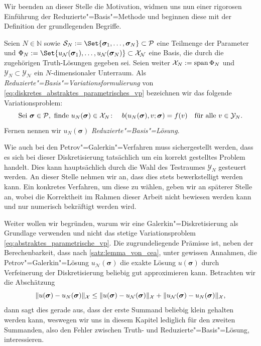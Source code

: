 \documentclass[../main.tex]{subfiles}
\begin{document}
Wir beenden an dieser Stelle die Motivation, widmen uns nun einer rigorosen Einführung der Reduzierte"=Basis"=Methode und beginnen diese mit der Definition der grundlegenden Begriffe.

\begin{Definition}
\label{definition:rb_variationsproblem}
    Seien $N \in \mathbb{N}$ sowie $\mathcal S_{N} := \Set{ \bm \sigma_{1}, \dots, \bm \sigma_{N} } \subset \mathcal P$ eine Teilmenge der Parameter und $\Phi_{N} := \Set{ u_{\mathcal N}(\bm \sigma_{1}), \dots, u_{\mathcal N}(\bm \sigma_{N})} \subset \mathcal X_{\mathcal N}$ eine Basis, die durch die zugehörigen Truth-Lösungen gegeben sei.
    Seien weiter $\mathcal X_{N} := \operatorname{span} \Phi_{N}$ und $\mathcal Y_{N} \subset \mathcal Y_{\mathcal N}$ ein $N$-dimensionaler Unterraum.
    Als \emph{Reduzierte"=Basis"=Variationsformulierung} von \cref{eq:diskretes_abstraktes_parametrisches_vp} bezeichnen wir das folgende Variationsproblem:
    \begin{equation}
    \label{eq:rb_abstraktes_parametriches_vp}
        \text{Sei } \bm \sigma \in \mathcal P, \text{ finde } u_{N}(\bm \sigma) \in \mathcal X_{N} \colon \quad b(u_{N}(\bm \sigma), v; \bm \sigma) = f(v) \quad \fa v \in \mathcal Y_{N}.
    \end{equation}
    Fernen nennen wir $u_{N}(\bm \sigma)$ \emph{Reduzierte"=Basis"=Lösung}.
\end{Definition}

Wie auch bei den Petrov"=Galerkin"=Verfahren muss sichergestellt werden, dass es sich bei dieser Diskretisierung tatsächlich um ein korrekt gestelltes Problem handelt.
Dies kann hauptsächlich durch die Wahl des Testraumes $\mathcal Y_{N}$ gesteuert werden.
An dieser Stelle nehmen wir an, dass dies stets bewerkstelligt werden kann.
Ein konkretes Verfahren, um diese zu wählen, geben wir an späterer Stelle an, wobei die Korrektheit im Rahmen dieser Arbeit nicht bewiesen werden kann und nur numerisch bekräftigt werden wird.

Weiter wollen wir begründen, warum wir eine Galerkin"=Diskretisierung als Grundlage verwenden und nicht das stetige Variationsproblem \cref{eq:abstraktes_parametrische_vp}.
Die zugrundeliegende Prämisse ist, neben der Berechenbarkeit, dass nach \cref{satz:lemma_von_cea}, unter gewissen Annahmen, die Petrov"=Galerkin"=Lösung $u_{\mathcal N}(\bm \sigma)$ die exakte Lösung $u(\bm \sigma)$ durch Verfeinerung der Diskretisierung beliebig gut approximieren kann.
Betrachten wir die Abschätzung
\begin{equation}
    \lVert u(\bm \sigma) - u_{N}(\bm \sigma)\rVert_{\mathcal X} \leq \lVert u(\bm \sigma) - u_{\mathcal N}(\bm \sigma)\rVert_{\mathcal X} + \lVert u_{\mathcal N}(\bm \sigma) - u_{N}(\bm \sigma)\rVert_{\mathcal X},
\end{equation}
dann sagt dies gerade aus, dass der erste Summand beliebig klein gehalten werden kann, weswegen wir uns in diesem Kapitel lediglich für den zweiten Summanden, also den Fehler zwischen Truth- und Reduzierte"=Basis"=Lösung, interessieren.
\end{document}
